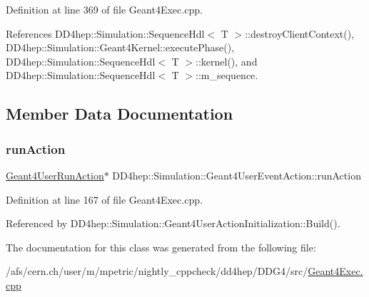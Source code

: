 Definition at line 369 of file Geant4\+Exec.\+cpp.



References D\+D4hep\+::\+Simulation\+::\+Sequence\+Hdl$<$ T $>$\+::destroy\+Client\+Context(), D\+D4hep\+::\+Simulation\+::\+Geant4\+Kernel\+::execute\+Phase(), D\+D4hep\+::\+Simulation\+::\+Sequence\+Hdl$<$ T $>$\+::kernel(), and D\+D4hep\+::\+Simulation\+::\+Sequence\+Hdl$<$ T $>$\+::m\+\_\+sequence.



\subsection{Member Data Documentation}
\hypertarget{class_d_d4hep_1_1_simulation_1_1_geant4_user_event_action_ac97fb9f30ba15e30d50897aabc0ad004}{}\label{class_d_d4hep_1_1_simulation_1_1_geant4_user_event_action_ac97fb9f30ba15e30d50897aabc0ad004} 
\subsubsection{\texorpdfstring{run\+Action}{runAction}}
{\footnotesize\ttfamily \hyperlink{class_d_d4hep_1_1_simulation_1_1_geant4_user_run_action}{Geant4\+User\+Run\+Action}$\ast$ D\+D4hep\+::\+Simulation\+::\+Geant4\+User\+Event\+Action\+::run\+Action}



Definition at line 167 of file Geant4\+Exec.\+cpp.



Referenced by D\+D4hep\+::\+Simulation\+::\+Geant4\+User\+Action\+Initialization\+::\+Build().



The documentation for this class was generated from the following file\+:\begin{DoxyCompactItemize}
\item 
/afs/cern.\+ch/user/m/mpetric/nightly\+\_\+cppcheck/dd4hep/\+D\+D\+G4/src/\hyperlink{_geant4_exec_8cpp}{Geant4\+Exec.\+cpp}\end{DoxyCompactItemize}
